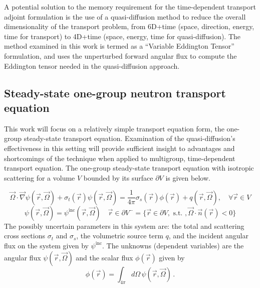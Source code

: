 \documentclass{article}
\newcommand{\vr}{\vec{r}}
\newcommand{\vO}{\vec{\Omega}}
\newcommand{\grad}{\vec{\nabla}}
\newcommand{\sigt}{\sigma_t}
\newcommand{\sigs}{\sigma_s}
\begin{document}
A potential solution to the memory requirement for the time-dependent transport adjoint formulation is the use of a quasi-diffusion method to reduce the overall dimensionality of the transport problem, from 6D+time (space, direction, energy, time for transport) to 4D+time (space, energy, time for quasi-diffusion). The method examined in this work is termed  as a ``Variable Eddington Tensor'' formulation, and uses the unperturbed forward angular flux to compute the Eddington tensor needed in the quasi-diffusion approach.


\subsection{Steady-state one-group neutron transport equation}

This work will focus on a relatively simple transport equation form, the one-group steady-state transport equation. Examination of the quasi-diffusion's effectiveness in this setting will provide sufficient insight to advantages and shortcomings of the technique when applied to multigroup, time-dependent transport equation. The one-group steady-state transport equation with isotropic scattering for a volume $V$ bounded by its surface $\partial V$ is given below.

\begin{equation}
\label{SS1GTE}
\vO \cdot \grad \psi(\vr,\vO) + \sigt(\vr) \psi(\vr,\vO) = \frac{1}{4 \pi} \sigs(\vr) \phi(\vr) + q(\vr,\vO), \quad \forall \vr \in V
\end{equation}
\begin{equation}
\label{SS1GTE_bc}
\psi(\vr,\vO) = \psi^{\text{inc}}(\vr,\vO) \quad \vr \in \partial V^{-} = \{ \vr \in \partial V, \text{ s.t. }, \vO \cdot \vec{n}(\vr) < 0\}
\end{equation}
The possibly uncertain parameters in this system are: the total and scattering cross sections $\sigt$ and $\sigs$, the volumetric source term $q$, and the incident angular flux on the system given by $\psi^{\text{inc}}$. The unknowns (dependent variables) are the angular flux $\psi(\vr,\vO)$ and the scalar flux $\phi(\vr)$ given by
\[
\phi(\vr) = \int_{4\pi}d\Omega\,\psi(\vr,\vO) \,.
\]
\end{document}
